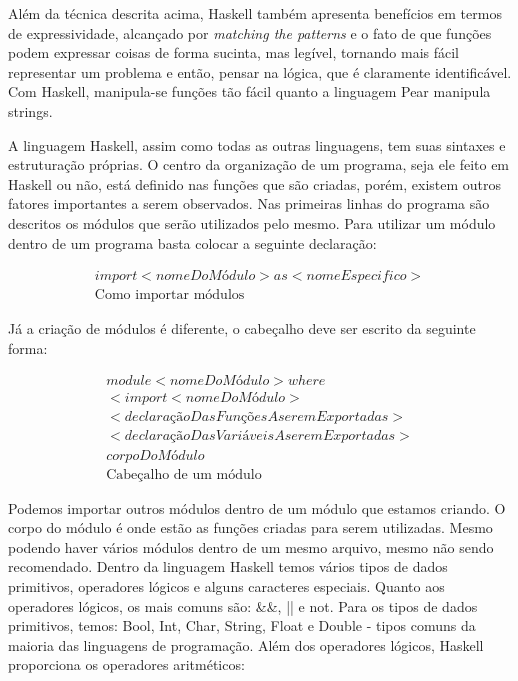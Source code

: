 \documentclass[
  12pt,				         %
  oneside,			       %
  a4paper,			       %
  english,		       	 %
  brazil,			      	 %
]{abntex2}
\begin{document}
    Além da técnica descrita acima, Haskell também apresenta benefícios em termos de expressividade, alcançado por \emph{matching the patterns} e o fato de que funções podem
    expressar coisas de forma sucinta, mas legível, tornando mais fácil representar um problema e então, pensar na lógica, que é claramente identificável. Com Haskell,
    manipula-se funções tão fácil quanto a linguagem Pear manipula strings.

    A linguagem Haskell, assim como todas as outras linguagens, tem suas sintaxes e estruturação próprias. O centro da organização de um programa, seja ele feito em Haskell ou não,
    está definido nas funções que são criadas, porém, existem outros fatores importantes a serem observados.
    Nas primeiras linhas do programa são descritos os módulos que serão utilizados pelo mesmo. Para utilizar um módulo dentro de um programa basta colocar a seguinte declaração:

    \begin{gather*}
      import<nomeDoMódulo> as <nomeEspecifico> \\
      \text{Como importar módulos}
    \end{gather*}

    Já a criação de módulos é diferente, o cabeçalho deve ser escrito da seguinte forma:

    \begin{gather*}
      module<nomeDoMódulo>where \\
      <import<nomeDoMódulo> \\
      <declaraçãoDasFunçõesAseremExportadas> \\
      <declaraçãoDasVariáveisAseremExportadas> \\
      corpoDoMódulo \\
      \text{Cabeçalho de um módulo}
    \end{gather*}

    \newpage 

    Podemos importar outros módulos dentro de um módulo que estamos criando. O corpo do módulo é onde estão as funções criadas para serem utilizadas. Mesmo podendo haver vários módulos
    dentro de um mesmo arquivo, mesmo não sendo recomendado.
    Dentro da linguagem Haskell temos vários tipos de dados primitivos, operadores lógicos e alguns caracteres especiais. Quanto aos operadores lógicos, os mais comuns são:
    \&\&, || e not. Para os tipos de dados primitivos, temos: Bool, Int, Char, String, Float e Double - tipos comuns da maioria das linguagens de programação. 
    Além dos operadores lógicos, Haskell proporciona os operadores aritméticos:
\end{document}
